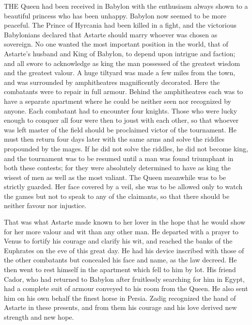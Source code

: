 \documentclass{article}
\begin{document}
\begin{center}
THE Queen had been received in Babylon with the enthusiasm always shown to a beautiful 
princess who has been unhappy. Babylon now seemed to be more peaceful. The Prince 
of Hyrcania had been killed in a fight, and the victorious Babylonians declared 
that Astarte should marry whoever was chosen as sovereign. No one wanted the most 
important position in the world, that of Astarte's husband and King of Babylon, 
to depend upon intrigue and faction; and all swore to acknowledge as king the man 
possessed of the greatest wisdom and the greatest valour. A huge tiltyard was made 
a few miles from the town, and was surrounded by amphitheatres magnificently decorated. 
Here the combatants were to repair in full armour. Behind the amphitheatres each 
was to have a separate apartment where he could be neither seen nor recognized 
by anyone. Each combatant had to encounter four knights. Those who were lucky enough 
to conquer all four were then to joust with each other, so that whoever was left 
master of the field should be proclaimed victor of the tournament. He must then 
return four days later with the same arms and solve the riddles propounded by the 
mages. If he did not solve the riddles, he did not become king, and the tournament 
was to be resumed until a man was found triumphant in both these contests; for 
they were absolutely determined to have as king the wisest of men as well as the 
most valiant. The Queen meanwhile was to be strictly guarded. Her face covered 
by a veil, she was to be allowed only to watch the games but not to speak to any 
of the claimants, so that there should be neither favour nor injustice. 

That was what Astarte made known to her lover in the hope that he would show for 
her more valour and wit than any other man. He departed with a prayer to Venus 
to fortify his courage and clarify his wit, and reached the banks of the Euphrates 
on the eve of this great day. He had his device inscribed with those of the other 
combatants but concealed his face and name, as the law decreed. He then went to 
rest himself in the apartment which fell to him by lot. His friend Cador, who had 
returned to Babylon after fruitlessly searching for him in Egypt, had a complete 
suit of armour conveyed to his room from the Queen. He also sent him on his own 
behalf the finest horse in Persia. Zadig recognized the hand of Astarte in these 
presents, and from them his courage and his love derived new strength and new hope. 


\end{center}
\end{document}
